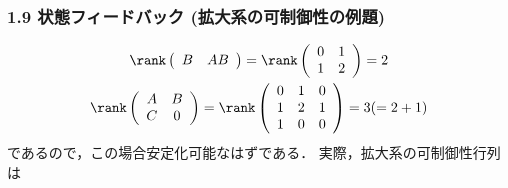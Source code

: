 \begin{frame}[t]
\frametitle{1.9 状態フィードバック (拡大系の可制御性の例題)}
\vspace*{-5mm}

\begin{gather}
 \rank
 \left(
 \begin{array}{cc}
  B & AB
 \end{array}
 \right) =
 \rank
 \left(
 \begin{array}{cc}
  0 & 1 \\
  1 & 2
 \end{array}
 \right) = 2 \\
 \rank
 \left(
 \begin{array}{cc}
  A & B \\
  C & 0
 \end{array}
 \right) =
 \rank
 \left(
 \begin{array}{ccc}
  0 & 1 & 0 \\
  1 & 2 & 1 \\
  1 & 0 & 0
 \end{array}
 \right) =
 3(= 2 + 1)
\end{gather}
であるので，この場合安定化可能なはずである．
実際，拡大系の可制御性行列は


\end{frame}

